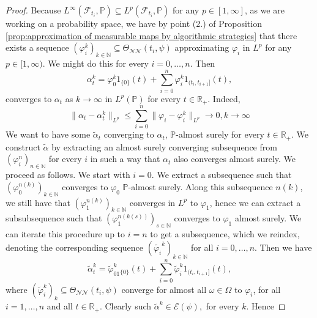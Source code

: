 \documentclass[11pt,a4paper,twoside,openany]{report}
\numberwithin{equation}{section}
\theoremstyle{plain} %
\theoremstyle{definition} %
\theoremstyle{remark} %
\begin{document}
\begin{proof}
     Because \(L^{\infty}(\mathcal{F}_{t_i},\mathbb{P})\subseteq L^p(\mathcal{F}_{t_i},\mathbb{P})\) for any \(p\in[1,\infty]\), as we are working on a probability space, we have by point (2.)  of Proposition \ref{prop:approximation of measurable maps by algorithmic strategies} that there exists a sequence \((\varphi_i^k)_{k\in\mathbb{N}}\subseteq\Theta_{\mathcal{NN}}(t_i,\psi)\) approximating \(\varphi_i\) in \(L^p\) for any \(p\in[1,\infty)\). 
    We might do this for every \(i=0,\dots, n\). Then 
    \begin{equation*}
        \alpha_t^k=\varphi_0^k1_{\{ 0\}}(t)+\sum_{i=0}^n \varphi_i^k1_{(t_i,t_{i+1}]}(t),
    \end{equation*}
    converges to \(\alpha_t\) as \(k\to\infty\) in \(L^p(\mathbb{P})\) for every \(t\in\mathbb{R}_+\). Indeed, 
    \begin{equation*}
        \lVert \alpha_t-\alpha_t^k\rVert_{L^p}\leq\sum_{i=0}^n\lVert\varphi_i-\varphi_i^k\rVert_{L^p}\to0,k\to\infty
    \end{equation*}
    We want to have some \(\widetilde{\alpha}_t\) converging to \(\alpha_t\), \(\mathbb{P}\)-almost surely for every \(t\in\mathbb{R}_+\). We construct \(\widetilde{\alpha}\) by extracting an almost surely converging subsequence from \((\varphi_i^n)_{n\in\mathbb{N}}\) for every \(i\) in such a way that \(\alpha_t\) also converges almost surely. We proceed as follows.
    We start with \(i=0\). We extract a subsequence such that \((\varphi_0^{n(k)})_{k\in\mathbb{N}}\) converges to \(\varphi_0\) \(\mathbb{P}\)-almost surely. Along this subsequence \(n(k)\), we still have that \((\varphi_{1}^{n(k)})_{k\in\mathbb{N}}\) converges in \(L^p\) to \(\varphi_1\), hence we can extract a subsubsequence such that \((\varphi_{1}^{n(k(s))})_{s\in\mathbb{N}}\) converges to \(\varphi_1\) almost surely. We can iterate this procedure up to \(i=n\) to get a subsequence, which we reindex, denoting the corresponding sequence \((\widetilde{\varphi_i}^k)_{k\in\mathbb{N}}\) for all \(i=0,\dots,n\). Then we have 
   \begin{equation*}
        \widetilde{\alpha}_t^{k} = \widetilde{\varphi}^{k}_01_{\{ 0\}}(t)+\sum_{i=0}^n \widetilde{\varphi}_i^{k}1_{(t_i,t_{i+1}]}(t),
    \end{equation*}
    where \((\widetilde{\varphi}_i^{k})_{k}\subseteq\Theta_{\mathcal{NN}}(t_i,\psi)\) converge for almost all \(\omega\in\Omega\) to \(\varphi_i\), for all \(i=1,\dots,n\) and all \(t\in\mathbb{R}_+\). Clearly such \(\widetilde{\alpha}^{k}\in\mathcal{E}(\psi),\) for every \(k\). Hence

\end{proof}
\end{document}
